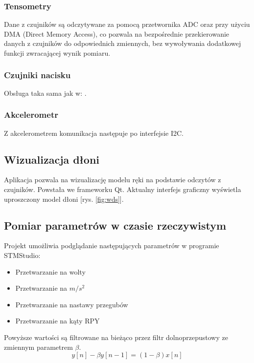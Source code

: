 \documentclass[12pt,a4paper]{article}
\begin{document}
\subsubsection{Tensometry} \label{tensometry}
Dane z czujników są odczytywane za pomocą przetwornika ADC oraz przy użyciu DMA (Direct Memory Access), co pozwala na bezpośrednie przekierowanie danych z czujników do odpowiednich zmiennych, bez wywoływania dodatkowej funkcji zwracającej wynik pomiaru.
\subsubsection{Czujniki nacisku}
Obsługa taka sama jak w: .
\subsubsection{Akcelerometr}
Z akcelerometrem komunikacja następuje po interfejsie I2C.



\subsection{Wizualizacja dłoni}
Aplikacja pozwala na wizualizację modelu ręki na podstawie odczytów z czujników. Powstała we frameworku Qt. Aktualny interfejs graficzny wyświetla uproszczony model dłoni [rys. \ref{fig:wds}].
\subsection{Pomiar parametrów w czasie rzeczywistym}
Projekt umożliwia podglądanie następujących parametrów w programie STMStudio:
\begin{itemize}
\item Przetwarzanie na wolty
\item Przetwarzanie na $m/s^2$
\item Przetwarzanie na nastawy przegubów
\item Przetwarzanie na kąty RPY
\end{itemize}
Powyższe wartości są filtrowane na bieżąco przez filtr dolnoprzepustowy ze zmiennym parametrem $\beta$.
\begin{equation}
y[n] - \beta y[n-1] = (1-\beta)x[n]
\end{equation}
\end{document}
